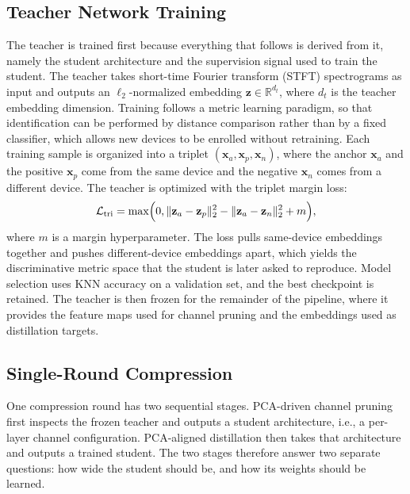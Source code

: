 \documentclass[journal,comsoc]{IEEEtran}
\begin{document}
\subsection{Teacher Network Training}
\label{subsec:teacher}
The teacher is trained first because everything that follows is derived from it, namely the student architecture and the supervision signal used to train the student.
The teacher takes short-time Fourier transform (STFT) spectrograms as input and outputs an $\ell_2$-normalized embedding $\mathbf{z} \in \mathbb{R}^{d_t}$, where $d_t$ is the teacher embedding dimension.
Training follows a metric learning paradigm, so that identification can be performed by distance comparison rather than by a fixed classifier, which allows new devices to be enrolled without retraining.
Each training sample is organized into a triplet $(\mathbf{x}_a, \mathbf{x}_p, \mathbf{x}_n)$, where the anchor $\mathbf{x}_a$ and the positive $\mathbf{x}_p$ come from the same device and the negative $\mathbf{x}_n$ comes from a different device.
The teacher is optimized with the triplet margin loss:
\begin{equation}
\label{eq:triplet}
\mathcal{L}_{\text{tri}} =
\max\Bigl(0,
\lVert \mathbf{z}_{a} - \mathbf{z}_{p} \rVert_2^2 -
\lVert \mathbf{z}_{a} - \mathbf{z}_{n} \rVert_2^2 + m
\Bigr),
\end{equation}
where $m$ is a margin hyperparameter.
The loss pulls same-device embeddings together and pushes different-device embeddings apart, which yields the discriminative metric space that the student is later asked to reproduce.
Model selection uses KNN accuracy on a validation set, and the best checkpoint is retained.
The teacher is then frozen for the remainder of the pipeline, where it provides the feature maps used for channel pruning and the embeddings used as distillation targets.

\subsection{Single-Round Compression}
\label{subsec:single_round}

One compression round has two sequential stages.
PCA-driven channel pruning first inspects the frozen teacher and outputs a student architecture, i.e., a per-layer channel configuration.
PCA-aligned distillation then takes that architecture and outputs a trained student.
The two stages therefore answer two separate questions: how wide the student should be, and how its weights should be learned.
\end{document}
